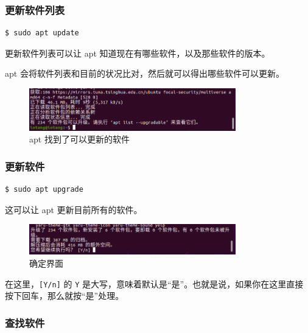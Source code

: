 \documentclass[UTF-8]{ctexart}
\begin{document}
			\subsubsection{更新软件列表}
				
				\begin{verbatim}
$ sudo apt update
				\end{verbatim}
			
				更新软件列表可以让 apt 知道现在有哪些软件，以及那些软件的版本。
				
				apt 会将软件列表和目前的状况比对，然后就可以得出哪些软件可以更新。
				
				\begin{figure}[H]
					\centering
					\includegraphics[width=0.8\textwidth]{fig/apt_update.png}
					\caption*{apt 找到了可以更新的软件}
				\end{figure}
			
			\subsubsection{更新软件}
	
				\begin{verbatim}
$ sudo apt upgrade
				\end{verbatim}
				
				这可以让 apt 更新目前所有的软件。
				
				\begin{figure}[H]
					\centering
					\includegraphics[width=0.8\textwidth]{fig/apt_upgrade_yn.png}
					\caption*{确定界面}
				\end{figure}
			
				在这里，\texttt{[Y/n]} 的 \texttt{Y} 是大写，意味着默认是“是”。也就是说，如果你在这里直接按下回车，那么就按“是”处理。
				
			\subsubsection{查找软件}
				
\end{document}
